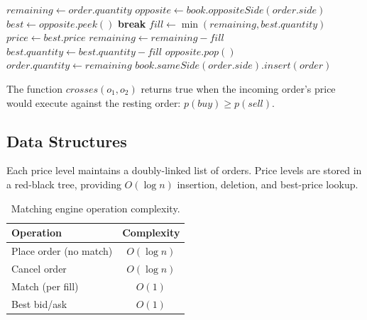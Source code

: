 \documentclass[11pt,a4paper]{article}
\begin{document}
\begin{algorithm}
\caption{Order matching with price-time priority.}
\begin{algorithmic}[1]
    \State $remaining \gets order.quantity$
    \State $opposite \gets book.oppositeSide(order.side)$
        \State $best \gets opposite.peek()$
            \State \textbf{break}
        \EndIf
        \State $fill \gets \min(remaining, best.quantity)$
        \State $price \gets best.price$ 
        \State {}
        \State $remaining \gets remaining - fill$
        \State $best.quantity \gets best.quantity - fill$
            \State $opposite.pop()$
        \EndIf
    \EndWhile
        \State $order.quantity \gets remaining$
        \State $book.sameSide(order.side).insert(order)$
    \EndIf
\EndFunction
\end{algorithmic}
\end{algorithm}

The function $crosses(o_1, o_2)$ returns true when the incoming order's price would execute against the resting order: $p(buy) \geq p(sell)$.

\subsection{Data Structures}

Each price level maintains a doubly-linked list of orders. Price levels are stored in a red-black tree, providing $O(\log n)$ insertion, deletion, and best-price lookup.

\begin{table}[h]
\centering
\caption{Matching engine operation complexity.}
\begin{tabular}{lc}
\toprule
\textbf{Operation} & \textbf{Complexity} \\
\midrule
Place order (no match) & $O(\log n)$ \\
Cancel order & $O(\log n)$ \\
Match (per fill) & $O(1)$ \\
Best bid/ask & $O(1)$ \\
\bottomrule
\end{tabular}
\end{table}
\end{document}
